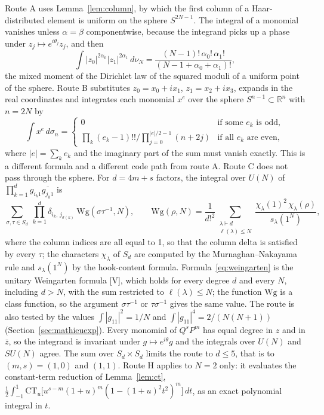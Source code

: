 \documentclass[11pt]{article}
\theoremstyle{remark}
\begin{document}
Route A uses Lemma~\ref{lem:column}, by which the first column of a Haar-distributed element is uniform on the sphere $S^{2N-1}$. The integral of a monomial vanishes unless $\alpha=\beta$ componentwise, because the integrand picks up a phase under $z_j\mapsto e^{i\theta_j}z_j$, and then
\begin{equation}\label{eq:spheremoment}
\int|z_0|^{2\alpha_0}|z_1|^{2\alpha_1}\,d\nu_N=\frac{(N-1)!\,\alpha_0!\,\alpha_1!}{(N-1+\alpha_0+\alpha_1)!},
\end{equation}
the mixed moment of the Dirichlet law of the squared moduli of a uniform point of the sphere. Route B substitutes $z_0=x_0+ix_1$, $z_1=x_2+ix_3$, expands in the real coordinates and integrates each monomial $x^e$ over the sphere $S^{n-1}\subset\mathbb R^n$ with $n=2N$ by
\begin{equation}\label{eq:realmoment}
\int x^e\,d\sigma_n=\begin{cases}0&\text{if some }e_k\text{ is odd},\\[2pt] \displaystyle\prod_k(e_k-1)!!\Big/\prod_{j=0}^{|e|/2-1}(n+2j)&\text{if all }e_k\text{ are even},\end{cases}
\end{equation}
where $|e|=\sum_ke_k$ and the imaginary part of the sum must vanish exactly. This is a different formula and a different code path from route A. Route C does not pass through the sphere. For $d=4m+s$ factors, the integral over $U(N)$ of $\prod_{k=1}^dg_{i_k1}\overline{g_{j_k1}}$ is
\begin{equation}\label{eq:weingarten}
\sum_{\sigma,\tau\in S_d}\ \prod_{k=1}^d\delta_{i_k,\,j_{\sigma(k)}}\ \mathrm{Wg}(\sigma\tau^{-1},N),\qquad \mathrm{Wg}(\rho,N)=\frac1{d!^2}\sum_{\substack{\lambda\vdash d\\ \ell(\lambda)\le N}}\frac{\chi_\lambda(1)^2\,\chi_\lambda(\rho)}{s_\lambda(1^N)},
\end{equation}
where the column indices are all equal to 1, so that the column delta is satisfied by every $\tau$; the characters $\chi_\lambda$ of $S_d$ are computed by the Murnaghan--Nakayama rule and $s_\lambda(1^N)$ by the hook-content formula. Formula~\eqref{eq:weingarten} is the unitary Weingarten formula \cite[Proposition~2.3, equation~(9), p.~4, and Corollary~2.4, equation~(11), p.~5]{CollinsSniady2006} [V], which holds for every degree $d$ and every $N$, including $d>N$, with the sum restricted to $\ell(\lambda)\le N$; the function $\mathrm{Wg}$ is a class function, so the argument $\sigma\tau^{-1}$ or $\tau\sigma^{-1}$ gives the same value. The route is also tested by the values $\int|g_{11}|^2=1/N$ and $\int|g_{11}|^4=2/(N(N+1))$ (Section~\ref{sec:mathieuexp}). Every monomial of $Q^sP^m$ has equal degree in $z$ and in $\bar z$, so the integrand is invariant under $g\mapsto e^{i\theta}g$ and the integrals over $U(N)$ and $SU(N)$ agree. The sum over $S_d\times S_d$ limits the route to $d\le5$, that is to $(m,s)=(1,0)$ and $(1,1)$. Route H applies to $N=2$ only: it evaluates the constant-term reduction of Lemma~\ref{lem:ct}, $\tfrac12\int_{-1}^{1}\mathrm{CT}_u\big[u^{s-m}(1+u)^m(1-(1+u)^2t^2)^m\big]\,dt$, as an exact polynomial integral in $t$.
\end{document}
